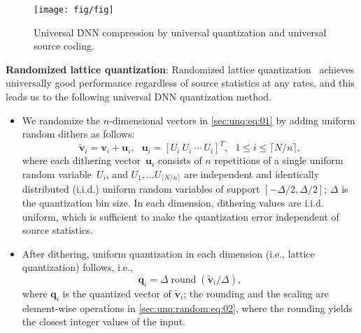 \documentclass{article}
\theoremstyle{remark}
\newcommand{\round}{\operatorname{round}}
\begin{document}
\begin{figure}[t!]
\centering
\texttt{[image: fig/fig]}
\caption{Universal DNN compression by universal quantization and universal source coding.\label{sec:unq:random:fig:01}}
\vspace{-1em}
\end{figure}

\textbf{Randomized lattice quantization}: Randomized lattice quantization~\cite{ziv1985universal} achieves universally good performance regardless of source statistics at any rates, and this leads us to the following universal DNN quantization method.

\begin{itemize}[noitemsep,topsep=0em,leftmargin=1.2em]
\item We randomize the $n$-dimensional vectors in \eqref{sec:unq:eq:01} by adding uniform random dithers as follows:
\begin{equation} \label{sec:unq:random:eq:01}
\tilde{\mathbf{v}}_i=\mathbf{v}_i+\mathbf{u}_i,
\ \ \
\mathbf{u}_i=[U_i\ U_i\ \cdots\ U_i]^T,
\ \ \
1\leq i\leq\lceil N/n\rceil,
\end{equation}
where each dithering vector~$\mathbf{u}_i$ consists of $n$ repetitions of a single uniform random variable~$U_i$, and $U_1,\dots U_{\lceil N/n\rceil}$ are independent and identically distributed (i.i.d.) uniform random variables of support $[-\Delta/2,\Delta/2]$; $\Delta$ is the quantization bin size. In each dimension, dithering values are i.i.d. uniform, which is sufficient to make the quantization error independent of source statistics. %
\item After dithering, uniform quantization in each dimension (i.e., lattice quantization) follows, i.e.,
\begin{equation} \label{sec:unq:random:eq:02}
\mathbf{q}_i=\Delta\round(\tilde{\mathbf{v}}_i/\Delta),
\end{equation}
where $\mathbf{q}_i$ is the quantized vector of $\tilde{\mathbf{v}}_i$; the rounding and the scaling are element-wise operations in \eqref{sec:unq:random:eq:02}, where the rounding yields the closest integer values of the input.
\end{itemize}
\end{document}
